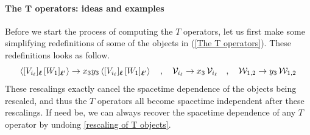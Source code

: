 \paragraph[The $T$ operators: ideas and examples]{The $\mathbf{T}$ operators: ideas and examples}
Before we start the process of computing the $T$ operators, let us first make some simplifying redefinitions of some of the objects in (\ref{The T operators}). These redefinitions looks as follow.
%
%
\begin{equation}\label{rescaling of T objects}
\expval{[V_{i_{\ell}}]_{\boldsymbol{\ell}} \, [W_1]_{\boldsymbol{\ell}'}}
\to
x_3 y_3 \expval{[V_{i_{\ell}}]_{\boldsymbol{\ell}} \, [W_1]_{\boldsymbol{\ell}'}}
%
\quad , \quad
%
\mathcal{V}_{i_\ell} \to x_3 \, \mathcal{V}_{i_\ell}
%
\quad , \quad
%
\mathcal{W}_{1,2} \to y_3 \, \mathcal{W}_{1,2}
\end{equation}
%
%
These rescalings exactly cancel the spacetime dependence of the objects being rescaled, and thus the $T$ operators all become spacetime independent after these rescalings. If need be, we can always recover the spacetime dependence of any $T$ operator by undoing \ref{rescaling of T objects}.

